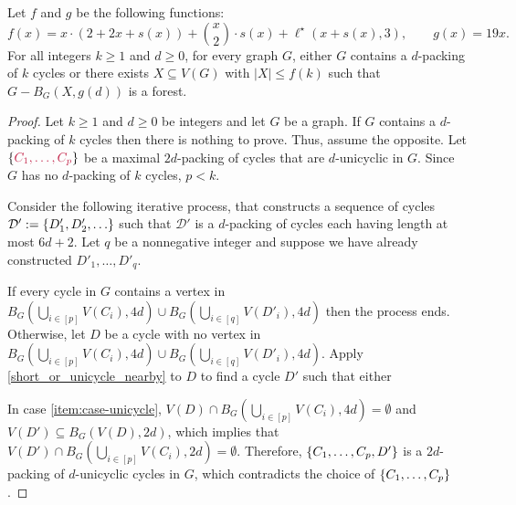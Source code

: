 \documentclass{patmorin}
\newcommand{\gwen}[1]{\textcolor{Purple}{Gwen: #1}}
\DeclarePairedDelimiter\set{\{}{\}}
\begin{document}
\begin{thm}\label{thm:the-big-ball-of-wax}
  Let $f$ and $g$ be the following functions:
  \[
    \textstyle f(x)=
  x\cdot (2+2x+s(x)) + \binom{x}{2}\cdot s(x) + \ell^\star(x+s(x),3), \qquad
    g(x)= 19x.
  \]
  For all integers $k\ge 1$ and $d\ge 0$, for every graph $G$, either $G$ contains a $d$-packing of $k$ cycles or there exists $X\subseteq V(G)$ with $|X|\leq f(k)$ such that $G-B_G(X,g(d))$ is a forest.
\end{thm}

\begin{proof}
  Let $k\ge 1$ and $d\ge 0$ be integers and let $G$ be a graph. If $G$ contains a $d$-packing of $k$ cycles then there is nothing to prove. Thus, assume the opposite. Let $\set{\mathdefin{C_1,\ldots,C_p}}$ be a maximal $2d$-packing of cycles that are $d$-unicyclic in $G$.  Since $G$ has no $d$-packing of $k$ cycles, $p<k$.

  Consider the following iterative process, that
  constructs a sequence of cycles 
  $\mathcal{D}':=\set{D'_1,D'_2,\ldots}$ such that $\mathcal{D}'$ is a $d$-packing of cycles each having length at most $6d+2$. Let $q$ be a nonnegative integer and suppose we have already constructed $D'_1,\ldots,D'_{q}$. 

  If every cycle in $G$ contains a vertex in  $B_G(\bigcup_{i\in[p]} V(C_i),4d)\cup B_G(\bigcup_{i\in[q]}V(D'_i),4d)$ then the process ends.  Otherwise, let $D$ be a cycle with no vertex in $B_G(\bigcup_{i\in[p]} V(C_i),4d)\cup B_G(\bigcup_{i\in[q]}V(D'_i),4d)$.   Apply \cref{short_or_unicycle_nearby} to $D$ to find a cycle $D'$ such that either 
   In case \cref{item:case-unicycle},
   $V(D)\cap B_G(\bigcup_{i\in[p]} V(C_i),4d)=\emptyset$ and $V(D')\subseteq B_G(V(D),2d)$, which implies that $V(D')\cap B_G(\bigcup_{i\in[p]} V(C_i),2d)=\emptyset$. Therefore, $\set{C_1,\ldots,C_p,D'}$ is a $2d$-packing of $d$-unicyclic cycles in $G$, which contradicts the choice of $\set{C_1,\ldots,C_p}$.
   

\end{proof}
\end{document}
